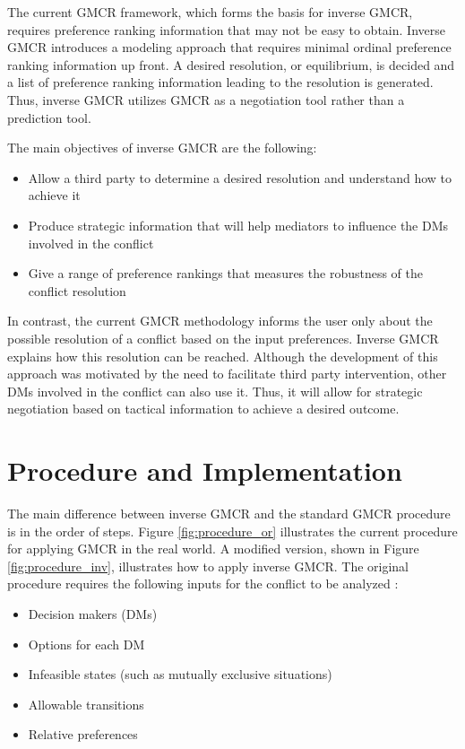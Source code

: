 \documentclass[letterpaper,12pt,titlepage,oneside,final]{book}
\begin{document}
The current GMCR framework, which forms the basis for inverse GMCR, requires preference ranking information that may not be easy to obtain. Inverse GMCR introduces a modeling approach that requires minimal ordinal preference ranking information up front. A desired resolution, or equilibrium, is decided and a list of preference ranking information leading to the resolution is generated. Thus, inverse GMCR utilizes GMCR as a negotiation tool rather than a prediction tool.

The main objectives of inverse GMCR are the following:
\begin{itemize}
\item Allow a third party to determine a desired resolution and understand how to achieve it
\item Produce strategic information that will help mediators to influence the DMs involved in the conflict
\item Give a range of preference rankings that measures the robustness of the conflict resolution
\end{itemize}

\noindent In contrast, the current GMCR methodology informs the user only about the possible resolution of a conflict based on the input preferences. Inverse GMCR explains how this resolution can be reached. Although the development of this approach was motivated by the need to facilitate third party intervention, other DMs involved in the conflict can also use it. Thus, it will allow for strategic negotiation based on tactical information to achieve a desired outcome.




\section{Procedure and Implementation}

The main difference between inverse GMCR and the standard GMCR procedure is in the order of steps. Figure \ref{fig:procedure_or} illustrates the current procedure for applying GMCR in the real world. A modified version, shown in Figure \ref{fig:procedure_inv}, illustrates how to apply inverse GMCR. The original procedure requires the following inputs for the conflict to be analyzed \cite{Fang1989,fang1993}:
\begin{itemize}
\item Decision makers (DMs)
\item Options for each DM
\item Infeasible states (such as mutually exclusive situations)
\item Allowable transitions
\item Relative preferences
\end{itemize}
\end{document}
